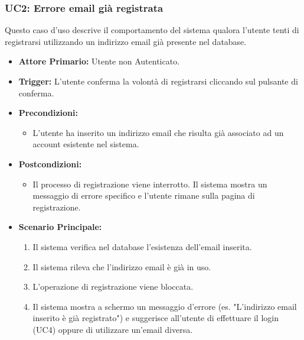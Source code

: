 \documentclass[12pt, a4paper]{article}
\begin{document}
\subsubsection{UC2: Errore email già registrata}\label{uc:2}
Questo caso d'uso descrive il comportamento del sistema qualora l'utente tenti di registrarsi utilizzando un indirizzo email già presente nel database.
\begin{itemize}
    \item \textbf{Attore Primario:} Utente non Autenticato.
    \item \textbf{Trigger:} L'utente conferma la volontà di registrarsi cliccando sul pulsante di conferma.
    \item \textbf{Precondizioni:}\begin{itemize}\item L'utente ha inserito un indirizzo email che risulta già associato ad un account esistente nel sistema.\end{itemize}
    \item \textbf{Postcondizioni:}\begin{itemize}\item Il processo di registrazione viene interrotto. Il sistema mostra un messaggio di errore specifico e l'utente rimane sulla pagina di registrazione.\end{itemize}
    \item \textbf{Scenario Principale:}
    \begin{enumerate}
        \item Il sistema verifica nel database l'esistenza dell'email inserita.
        \item Il sistema rileva che l'indirizzo email è già in uso.
        \item L'operazione di registrazione viene bloccata.
        \item Il sistema mostra a schermo un messaggio d'errore (es. "L'indirizzo email inserito è già registrato") e suggerisce all'utente di effettuare il login (UC4) oppure di utilizzare un'email diversa.
    \end{enumerate}
\end{itemize}
\end{document}
